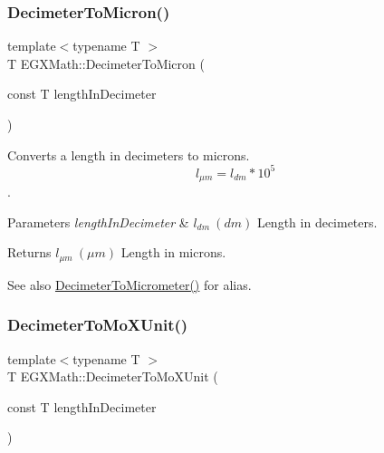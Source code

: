 \subsubsection{\texorpdfstring{Decimeter\+To\+Micron()}{DecimeterToMicron()}}
{\footnotesize\ttfamily template$<$typename T $>$ \\
T E\+G\+X\+Math\+::\+Decimeter\+To\+Micron (\begin{DoxyParamCaption}\item[{const T}]{length\+In\+Decimeter }\end{DoxyParamCaption})}



Converts a length in decimeters to microns. \[ l_{\mu m}=l_{dm} * 10^{5} \]. 


\begin{DoxyParams}{Parameters}
{\em length\+In\+Decimeter} & $ l_{dm}\ (dm)$ Length in decimeters. \\
\hline
\end{DoxyParams}
\begin{DoxyReturn}{Returns}
$ l_{\mu m}\ (\mu m)$ Length in microns. 
\end{DoxyReturn}
\begin{DoxySeeAlso}{See also}
\mbox{\hyperlink{group___e_g_x_math-_conversions-_length_conversions-_s_i-_decimeter-_s_i_ga5cf28083fa005b5a6a0dd6817c1633b7}{Decimeter\+To\+Micrometer()}} for alias. 
\end{DoxySeeAlso}
\mbox{\label{group___e_g_x_math-_conversions-_length_conversions-_s_i-_decimeter-_non-_s_i_ga609f53e09c9a767639da3ad72905bb71}} 
\subsubsection{\texorpdfstring{Decimeter\+To\+Mo\+X\+Unit()}{DecimeterToMoXUnit()}}
{\footnotesize\ttfamily template$<$typename T $>$ \\
T E\+G\+X\+Math\+::\+Decimeter\+To\+Mo\+X\+Unit (\begin{DoxyParamCaption}\item[{const T}]{length\+In\+Decimeter }\end{DoxyParamCaption})}



